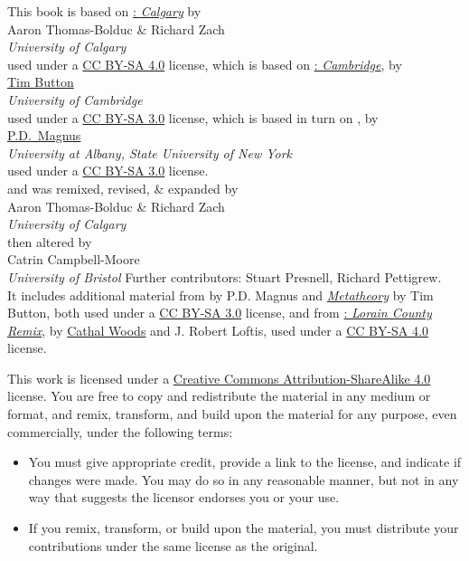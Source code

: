 \noindent
 \small This book is based on \href{https://github.com/rzach/forallx-yyc/}{\forallx: \emph{Calgary}} by\\[2ex] {Aaron Thomas-Bolduc \& Richard Zach}\\
 \emph{University of Calgary}
 \\[2ex]
used under a \href{https://creativecommons.org/licenses/by-sa/4.0/}{CC BY-SA 4.0} license, which is based on \href{http://people.ds.cam.ac.uk/tecb2/forallx.shtml}{\forallx:\emph{ Cambridge}}, by\\[2ex]
\href{http://people.ds.cam.ac.uk/tecb2/index.shtml}{Tim Button}\\
\emph{University of Cambridge}\\[2ex]
used under a \href{https://creativecommons.org/licenses/by-sa/3.0/}{CC BY-SA 3.0} license, which is based in turn on \href{https://www.fecundity.com/logic/}{\forallx}, by\\[2ex]
\href{https://www.fecundity.com/job/}{P.D.\ Magnus}\\
\emph{University at Albany, State University of New York}\\[2ex]
used under a \href{https://creativecommons.org/licenses/by-sa/3.0/}{CC BY-SA 3.0} license.
\\
and was remixed, revised, \& expanded by\\[2ex] {Aaron Thomas-Bolduc \& Richard Zach}\\
\emph{University of Calgary}
\\
then altered by \\[2ex] {Catrin Campbell-Moore}\\\emph{University of Bristol}
Further contributors: Stuart Presnell, Richard Pettigrew.
\\[2ex]
It includes additional material from \forallx{} by P.D. Magnus
and \href{http://people.ds.cam.ac.uk/tecb2/metatheory.shtml}{\emph{Metatheory}} by Tim Button, both used under
a \href{https://creativecommons.org/licenses/by-sa/3.0/}{CC BY-SA 3.0}
license, and from \href{https://github.com/rob-helpy-chalk/openintroduction}{\forallx: \emph{Lorain County Remix}}, by \href{https://sites.google.com/site/cathalwoods/}{Cathal
Woods} and J. Robert Loftis, used under
a \href{https://creativecommons.org/licenses/by-sa/4.0/}{CC BY-SA 4.0}
license.

\bigskip

\noindent \footnotesize This work is licensed under a \href{https://creativecommons.org/licenses/by-sa/4.0/}{Creative Commons Attribution-ShareAlike 4.0} license. 
You are free to copy and redistribute the material in any medium or format, and  remix, transform, and build upon the material for any purpose, even commercially, under the following terms:
\begin{itemize}
\item You must give appropriate credit, provide a link to the license, and indicate if changes were made. You may do so in any reasonable manner, but not in any way that suggests the licensor endorses you or your use.
\item If you remix, transform, or build upon the material, you must distribute your contributions under the same license as the original.
\end{itemize}

